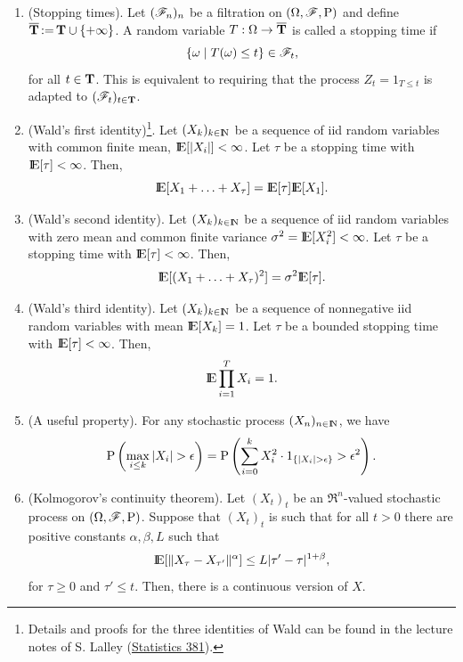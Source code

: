 \documentclass[a4paper,10pt]{scrbook}
\begin{document}
\begin{enumerate}
 \item (\hypertarget{link:stopping_time}{Stopping times}). Let $(\mathscr{F}_n)_n$ be a filtration on $(\Omega,\mathscr{F},\mathrm{P})$ and define $\overline{\mathbf{T}} {}\mathop{\mathrel{:}=}{} \mathbf{T} \cup \{+\infty\}$.
       A random variable $T: \Omega \to \overline{\mathbf{T}}$ is called a stopping time if
       \[
        \{\omega {}\mid{} T(\omega) \leq t\} \in \mathscr{F}_t,
       \]
      for all $t\in \mathbf{T}$. This is equivalent to requiring that the process $Z_t = 1_{T \leq t}$ is adapted to $(\mathscr{F}_t)_{t\in \mathbf{T}}$.
      
 \item (Wald's first identity)\footnote{Details and proofs for the three identities of Wald 
       can be found in the lecture
       notes of S. Lalley (\href{http://galton.uchicago.edu/~lalley/Courses/381/}{Statistics 381}).}. 
       Let $(X_k)_{k\in\N}$ be a sequence of iid random variables with 
       common finite mean, $\E[|X_i|] < \infty$. Let $\tau$ be a stopping time with 
       $\E[\tau] < \infty$. Then,
       \[
        \E[X_1 + \ldots + X_\tau] = \E[\tau] \E[X_1].
       \]
       
 \item (Wald's second identity). Let $(X_k)_{k\in\N}$ be a sequence of iid random variables with 
       zero mean and common finite variance $\sigma^2 = \E[X_i^2] < \infty$. 
       Let $\tau$ be a stopping time with 
       $\E[\tau] < \infty$. Then,
       \[
        \E[(X_1 + \ldots + X_\tau)^2] = \sigma^2 \E[\tau].
       \]      
       
 \item (Wald's third identity). Let $(X_k)_{k\in\N}$ be a sequence of nonnegative iid random variables with 
       mean $\E[X_k]=1$.
       Let $\tau$ be a bounded stopping time with 
       $\E[\tau] < \infty$. Then,
       \[
        \E \prod_{i=1}^{T}X_i = 1.
       \]             

 \item (A useful property). For any stochastic process $(X_n)_{n\in\N}$, we have
 \[
  \prob\left(\max_{i\leq k}|X_i|>\epsilon\right) = \prob\left(\sum_{i=0}^{k}X_i^2 \cdot  1_{\{|X_i|>\epsilon\}}>\epsilon^2\right).
 \]
 \item \label{it:kolmogorov-cont-theorem} 
       (\hypertarget{link:kolmogorov_continuity_thm}{Kolmogorov's continuity theorem}). Let \((X_t)_t\) be an \(\Re^{n}\)-valued stochastic process on \((\Omega,\mathscr{F},\mathrm{P})\).
       Suppose that \((X_t)_t\) is such that for all \(t>0\) there 
       are positive constants \(\alpha, \beta, L\) such that 
       \[
        \E[\|X_{\tau} - X_{\tau'}\|^\alpha] \leq L |\tau' - \tau|^{1+\beta},
       \]
       for \(\tau \geq 0\) and \(\tau' \leq t\). Then, there is a continuous version of \(X\).
       

\end{enumerate}
\end{document}
